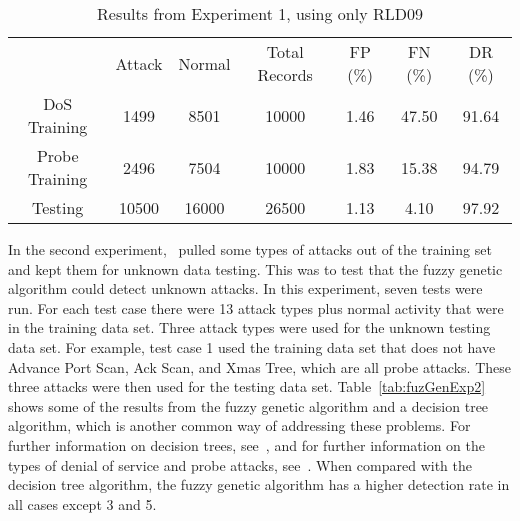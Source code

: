 \documentclass{sig-alternate}
\begin{document}
\begin{table*}
\center
\caption{Results from Experiment 1, using only RLD09}
\vspace{0.20cm}
\begin{tabular}{ccccccc}
 & Attack & Normal & Total Records & FP (\%) & FN (\%) & DR (\%)\\
DoS Training & 1499 & 8501 & 10000 & 1.46 & 47.50 & 91.64\\
Probe Training & 2496 & 7504 & 10000 & 1.83 & 15.38 & 94.79\\
Testing & 10500 & 16000 & 26500 & 1.13 & 4.10 & 97.92\\
\end{tabular}
\label{tab:fuzGenExp1}
\center
\end{table*}

In the second experiment,~\cite{6496342, 6559603} pulled some types of attacks out of the training set and kept them for unknown data testing. This was to test that the fuzzy genetic algorithm could detect unknown attacks. In this experiment, seven tests were run. For each test case there were 13 attack types plus normal activity that were in the training data set. Three attack types were used for the unknown testing data set. For example, test case 1 used the training data set that does not have Advance Port Scan, Ack Scan, and Xmas Tree, which are all probe attacks. These three attacks were then used for the testing data set. Table~\ref{tab:fuzGenExp2} shows some of the results from the fuzzy genetic algorithm and a decision tree algorithm, which is another common way of addressing these problems. For further information on decision trees, see~\cite{decisionTree}, and for further information on the types of denial of service and probe attacks, see~\cite{typesOfAttacks}. When compared with the decision tree algorithm, the fuzzy genetic algorithm has a higher detection rate in all cases except 3 and 5.
\end{document}
